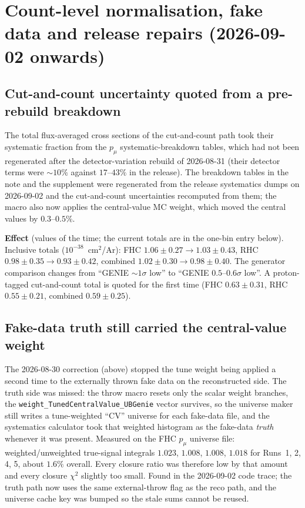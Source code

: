 \section{Count-level normalisation, fake data and release repairs (2026-09-02 onwards)}

\subsection{Cut-and-count uncertainty quoted from a pre-rebuild breakdown}

The total flux-averaged cross sections of the cut-and-count path took their systematic
fraction from the $p_\mu$ systematic-breakdown tables, which had not been regenerated
after the detector-variation rebuild of 2026-08-31 (their detector terms were
$\sim10\%$ against $17$--$43\%$ in the release).  The breakdown tables in the note and the
supplement were regenerated from the release systematics dumps on 2026-09-02 and the
cut-and-count uncertainties recomputed from them; the macro also now applies the
central-value MC weight, which moved the central values by $0.3$--$0.5\%$.

\textbf{Effect} (values of the time; the current totals are in the one-bin entry below).  Inclusive totals ($10^{-38}$~cm$^2$/Ar): FHC $1.06\pm0.27\to1.03\pm0.43$,
RHC $0.98\pm0.35\to0.93\pm0.42$, combined $1.02\pm0.30\to0.98\pm0.40$.  The generator
comparison changes from ``GENIE $\sim1\sigma$ low'' to ``GENIE $0.5$--$0.6\sigma$ low''.
A proton-tagged cut-and-count total is quoted for the first time (FHC $0.63\pm0.31$,
RHC $0.55\pm0.21$, combined $0.59\pm0.25$).

\subsection{Fake-data truth still carried the central-value weight}

The 2026-08-30 correction (above) stopped the tune weight being applied a second time
to the externally thrown fake data on the reconstructed side.  The truth side was
missed: the throw macro resets only the scalar weight branches, the
\texttt{weight\_TunedCentralValue\_UBGenie} vector survives, so the universe maker still
writes a tune-weighted ``CV'' universe for each fake-data file, and the systematics
calculator took that weighted histogram as the fake-data \emph{truth} whenever it was
present.  Measured on the FHC $p_\mu$ universe file: weighted/unweighted true-signal
integrals $1.023$, $1.008$, $1.008$, $1.018$ for Runs~1, 2, 4, 5, about $1.6\%$ overall.
Every closure ratio was therefore low by that amount and every closure $\chi^2$ slightly
too small.  Found in the 2026-09-02 code trace; the truth path now uses the same
external-throw flag as the reco path, and the universe cache key was bumped so the
stale sums cannot be reused.

